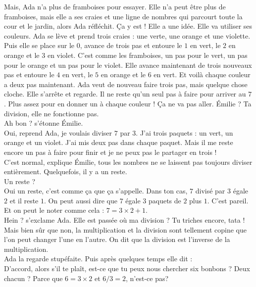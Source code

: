 Mais, Ada n'a plus de framboises pour essayer. Elle n'a peut être plus de framboises, mais elle a ses craies et une ligne de nombres qui parcourt toute la cour et le jardin, alors Ada réfléchit. Ça y est ! Elle a une idée. Elle va utiliser ses couleurs.
Ada se lève et prend trois craies : une verte, une orange et une violette. Puis elle se place sur le $0$, avance de trois pas et entoure le $1$ en vert, le $2$ en orange et le $3$ en violet. C'est comme les framboises, un pas pour le vert, un pas pour le orange et un pas pour le violet.
Elle avance maintenant de trois nouveaux pas et entoure le $4$ en vert, le $5$ en orange et le $6$ en vert. Et voilà chaque couleur a deux pas maintenant.
Ada veut de nouveau faire trois pas, mais quelque chose cloche. Elle s'arrête et regarde. Il ne reste qu'un seul pas à faire pour arriver au $7$. Plus assez pour en donner un à chaque couleur ! Ça ne va pas aller.
\guillemotleft Émilie ? Ta division, elle ne fonctionne pas.\\
\mdash Ah bon ? s'étonne Émilie. \\
\mdash Oui, reprend Ada, je voulais diviser $7$ par $3$. J'ai trois paquets : un vert, un orange et un violet. J'ai mis deux pas dans chaque paquet. Mais il me reste encore un pas à faire pour finir et je ne peux pas le partager en trois !\\
\mdash C'est normal, explique Émilie, tous les nombres ne se laissent pas toujours diviser entièrement. Quelquefois, il y a un reste. \\
\mdash Un reste ? \\
\mdash Oui un reste, c'est comme ça que ça s'appelle. Dans ton cas, $7$ divisé par $3$ égale $2$ et il reste $1$. On peut aussi dire que $7$ égale $3$ paquets de $2$ plus $1$. C'est pareil. Et on peut le noter comme cela : $7=3\times2+1$. \\
\mdash Hein ? s'exclame Ada. Elle est passée où ma division ? Tu triches encore, tata ! \\
\mdash Mais bien sûr que non, la multiplication et la division sont tellement copine que l'on peut changer l'une en l'autre. On dit que la division est l'inverse de la multiplication. \guillemotright\\
Ada la regarde stupéfaite. Puis après quelques temps elle dit : \\
\guillemotleft D'accord, alors s'il te plaît, est-ce que tu peux nous chercher six bonbons ? Deux chacun ? Parce que $6 = 3 \times 2$ et $6 / 3 = 2$, n'est-ce pas? \guillemotright 

